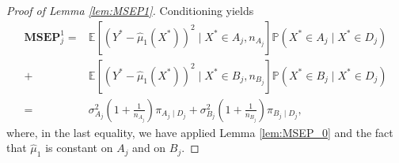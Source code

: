 \documentclass[11pt,a4paper]{article}
\renewcommand{\P}{\operatorname{P}}
\newcommand{\E }{\mathbb{E}}  %
\renewcommand{\P}{\mathbb{P}}  %
\newcommand{\MSEP}{\textbf{MSEP}}
\begin{document}
\begin{proof}[Proof of Lemma \ref{lem:MSEP1}]
	Conditioning yields
	\begin{align*}
		\MSEP^1_j
		= & \E \left[
		\left(Y^* - \hat \mu_1(X^*)\right)^2 \mid X^* \in A_j, n_{A_j} \right] \P(X^* \in A_j \mid X^* \in D_j )                                           \\
		+ & \E \left[
			\left(Y^* - \hat \mu_1(X^*)\right)^2 \mid X^* \in B_j,  n_{B_j}
		\right] \P(X^* \in B_j \mid X^* \in D_j )                                                                                                          \\
		= & \sigma_{{A_j}}^2\left(1 + \frac{1}{n_{A_j}} \right)\pi_{A_j \mid D_j} + \sigma_{{B_j}}^2\left(1 + \frac{1}{n_{B_j}} \right)\pi_{B_j \mid D_j},
	\end{align*}
	where, in the last equality, we have applied Lemma \ref{lem:MSEP_0} and the fact that $\hat \mu_1$ is constant on $A_j$ and on $B_j$.
\end{proof}
\end{document}
